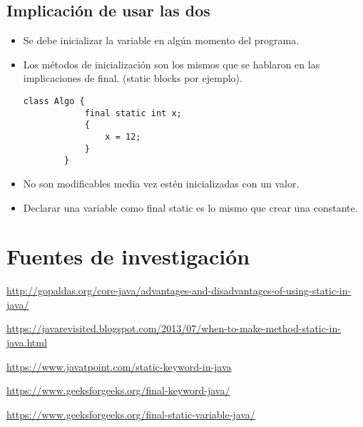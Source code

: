 \documentclass{article}
\begin{document}
\subsection{Implicación de usar las dos}
\begin{itemize}
    \item Se debe inicializar la variable en algún momento del programa.
    \item Los métodos de inicialización son los mismos que se hablaron en las implicaciones de final. (static blocks por ejemplo).
    \begin{Verbatim}[breaklines=true, breakanywhere=true]
        class Algo {
            final static int x; 
            {
                x = 12;
            }
        }
    \end{Verbatim}
    
    \item No son modificables media vez estén inicializadas con un valor.
    \item Declarar una variable como final static es lo mismo que crear una constante.
\end{itemize}




\section{Fuentes de investigación}
\begin{enumerate}[label={[}\arabic*{]}:]
    \item \url{http://gopaldas.org/core-java/advantages-and-disadvantages-of-using-static-in-java/}
    \item \url{https://javarevisited.blogspot.com/2013/07/when-to-make-method-static-in-java.html}
    \item \url{https://www.javatpoint.com/static-keyword-in-java}
    \item \url{https://www.geeksforgeeks.org/final-keyword-java/}
    \item \url{https://www.geeksforgeeks.org/final-static-variable-java/}
\end{enumerate}
\end{document}

